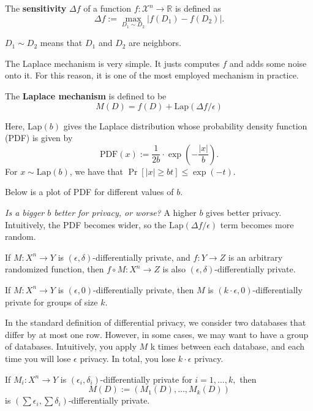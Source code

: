 \begin{definition}
    The \textbf{sensitivity} $\Delta f$ of a function $f: \mathcal{X}^n \to \mathbb{R}$ is defined as
    $$\Delta f := \max_{D_1 \sim D_2}|f(D_1) - f(D_2)|.$$

    $D_1\sim D_2$ means that $D_1$ and $D_2$ are neighbors.
\end{definition}

The Laplace mechanism is very simple. It justs computes $f$ and adds some noise onto it. For this reason, it is one of the most employed mechanism in practice.

\begin{definition}
    The \textbf{Laplace mechanism} is defined to be
    $$M(D) = f(D) + \text{Lap}(\Delta f / \epsilon)$$
\end{definition}

Here, Lap$(b)$ gives the Laplace distribution whose probability density function (PDF) is given by 
$$\text{PDF}(x) := \frac{1}{2b} \cdot \exp\left(-\frac{|x|}{b}\right).$$
For $x \sim \text{Lap}(b)$, we have that $\Pr [|x| \geq bt] \leq \exp (-t)$.

Below is a plot of PDF for different values of $b$.

\begin{center}
    \def\svgwidth{0.5\linewidth}
    
\end{center}

\textit{Is a bigger $b$ better for privacy, or worse?} A higher $b$ gives better privacy. Intuitively, the PDF becomes wider, so the $\text{Lap}(\Delta f / \epsilon)$ term becomes more random.

\begin{theorem}
    If $M: X^n \to Y$ is $(\epsilon, \delta)$-differentially private, and $f:Y\to Z$ is an arbitrary randomized function, then $f\circ M : X^n \to Z$ is also $(\epsilon, \delta)$-differentially private.
\end{theorem}

\begin{theorem}
    If $M: X^n \to Y$ is $(\epsilon, 0)$-differentially private, then $M$ is $(k\cdot \epsilon, 0)$-differentially private for groups of size $k$.

    In the standard definition of differential privacy, we consider two databases that differ by at most one row. However, in some cases, we may want to have a group of databases. Intuitively, you apply $M$ k times between each database, and each time you will lose $\epsilon$ privacy. In total, you lose $k \cdot \epsilon$ privacy.
\end{theorem}

\begin{theorem}[Composition]
    If $M_i: X^n \to Y$ is $(\epsilon_i, \delta_i)$-differentially private for $i = 1, \dots, k,$ then
    $$M(D) := (M_1(D), \dots, M_k(D))$$
    is $(\sum \epsilon_i, \sum \delta_i)$-differentially private.
\end{theorem}



